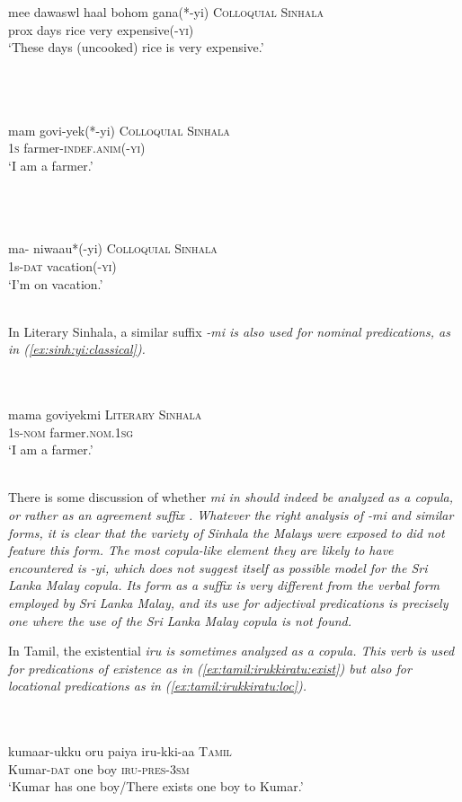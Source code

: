 \documentclass[a4paper,12pt]{article}
\newcommand{\xbox}[2]{\noindent\parbox[t]{#1}{#2}\noindent}
\newcommand{\xref}[1]{(\ref{#1})}
\newcommand{\ea}{\\\\}
\newcommand{\z}{\\\\}
\begin{document}
\xbox{\textwidth}{
\ea\label{ex:sinh:yi:adj:c}
\gll mee dawasw\E l\E{} haal bohom\E{} gana\ng(*-yi) \textsc{Colloquial Sinhala} \\
     prox days rice very expensive(-\textsc{yi})  \\
    `These days (uncooked) rice is very expensive.' \citep[795]{Gair2003} 
\z
} 


\xbox{\textwidth}{
\ea\label{ex:sinh:yi:n:c}
\gll mam\E{} govi-yek(*-yi)  \textsc{Colloquial Sinhala}\\
     1\textsc{s} farmer-\textsc{indef.anim}(-\textsc{yi})  \\
    `I am a farmer.' \citep[241]{Gair1998}
\z
}


\xbox{\textwidth}{
\ea\label{ex:sinh:yi:n:v}
\gll ma-\dott\E{} niwaa\dotd u*(-yi) \textsc{Colloquial Sinhala}\\
     1s-\textsc{dat} vacation(-\textsc{yi})  \\
    `I'm on vacation.' \citep[794]{Gair2003}
\z
}
 
In Literary Sinhala, a similar suffix \em -mi \em is also used for nominal predications, as in \xref{ex:sinh:yi:classical}.


\xbox{\textwidth}{
\ea\label{ex:sinh:yi:classical}
\gll mama  goviyekmi \textsc{Literary Sinhala} \\
     1\textsc{s}-\textsc{nom} farmer.\textsc{nom}.\textsc{1sg} \\
    `I am a farmer.' \citep[242]{Gair1998}
\z
} 

There is some discussion of whether \em mi \em in should indeed be analyzed as a copula, or rather as an agreement suffix \citep[242]{Gair1998}. Whatever the right analysis of \em -mi \em and similar forms, it is clear that the variety of Sinhala the Malays were exposed to did not feature this form. The most copula-like element they are likely to have encountered is \em -yi\em, which does not suggest itself as possible model for the Sri Lanka Malay copula. Its form as a suffix is very different from the verbal form employed by Sri Lanka Malay, and its use for adjectival predications is precisely one where the use of the Sri Lanka Malay copula is not found.

In Tamil, the existential \em iru \em is sometimes analyzed as a copula. This verb is used for predications of existence as in \xref{ex:tamil:irukkiratu:exist} but also for locational predications as in \xref{ex:tamil:irukkiratu:loc}.


\xbox{\textwidth}{
\ea\label{ex:tamil:irukkiratu:exist}
\gll kumaar-ukku oru paiya\textipa{\textsubbar{n}} iru-kki\textipa{\textsubbar{r}}-aa\textipa{\textsubbar{n}} \textsc{Tamil} \\
     Kumar-\textsc{dat} one boy \textsc{iru}-\textsc{pres}-\textsc{3sm}  \\
    `Kumar has one boy/There exists one boy to Kumar.' \citep[188]{Lehmann1989tamil}
\z
} 
\end{document}
